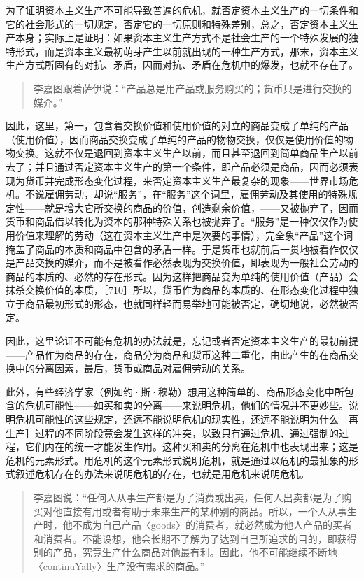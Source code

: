 为了证明资本主义生产不可能导致普遍的危机，就否定资本主义生产的一切条件和它的社会形式的一切规定，否定它的一切原则和特殊差别，总之，否定资本主义生产本身；实际上是证明：如果资本主义生产方式不是社会生产的一个特殊发展的独特形式，而是资本主义最初萌芽产生以前就出现的一种生产方式，那末，资本主义生产方式所固有的对抗、矛盾，因而对抗、矛盾在危机中的爆发，也就不存在了。

\begin{quote}{李嘉图跟着萨伊说：“产品总是用产品或服务购买的；货币只是进行交换的媒介。”}\end{quote}

因此，这里，第一，包含着交换价值和使用价值的对立的商品变成了单纯的产品（使用价值），因而商品交换变成了单纯的产品的物物交换，仅仅是使用价值的物物交换。这就不仅是退回到资本主义生产以前，而且甚至退回到简单商品生产以前去了；并且通过否定资本主义生产的第一个条件，即产品必须是商品，因而必须表现为货币并完成形态变化过程，来否定资本主义生产最复杂的现象——世界市场危机。不说雇佣劳动，却说“服务”，在“服务”这个词里，雇佣劳动及其使用的特殊规定性——就是增大它所交换的商品的价值，创造剩余价值，——又被抛弃了，因而货币和商品借以转化为资本的那种特殊关系也被抛弃了。“服务”是一种仅仅作为使用价值来理解的劳动（这在资本主义生产中是次要的事情），完全象“产品”这个词掩盖了商品的本质和商品中包含的矛盾一样。于是货币也就前后一贯地被看作仅仅是产品交换的媒介，而不是被看作必然表现为交换价值，即表现为一般社会劳动的商品的本质的、必然的存在形式。因为这样把商品变为单纯的使用价值（产品）会抹杀交换价值的本质，［710］所以，货币作为商品的本质的、在形态变化过程中独立于商品最初形式的形态，也就同样轻而易举地可能被否定，确切地说，必然被否定。

因此，这里论证不可能有危机的办法就是，忘记或者否定资本主义生产的最初前提——产品作为商品的存在，商品分为商品和货币这种二重化，由此产生的在商品交换中的分离因素，最后，货币或商品对雇佣劳动的关系。

此外，有些经济学家（例如约·斯·穆勒）想用这种简单的、商品形态变化中所包含的危机可能性——如买和卖的分离——来说明危机，他们的情况并不更妙些。说明危机可能性的这些规定，还远不能说明危机的现实性，还远不能说明为什么［再生产］过程的不同阶段竟会发生这样的冲突，以致只有通过危机、通过强制的过程，它们内在的统一才能发生作用。这种买和卖的分离在危机中也表现出来；这是危机的元素形式。用危机的这个元素形式说明危机，就是通过以危机的最抽象的形式叙述危机存在的办法来说明危机的存在，也就是用危机来说明危机。

\begin{quote}{李嘉图说：“任何人从事生产都是为了消费或出卖，任何人出卖都是为了购买对他直接有用或者有助于未来生产的某种别的商品。所以，一个人从事生产时，他不成为自己产品〈goods〉的消费者，就必然成为他人产品的买者和消费者。不能设想，他会长期不了解为了达到自己所追求的目的，即获得别的产品，究竟生产什么商品对他最有利。因此，他不可能继续不断地〈continuYally〉生产没有需求的商品。”}\end{quote}

